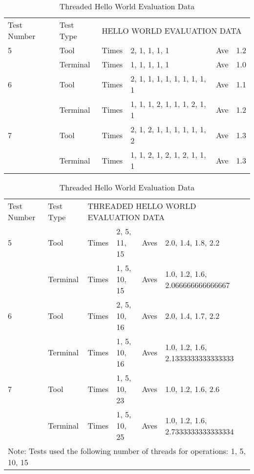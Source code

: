 \begin{table}[h!]
\begin{tabular}{llllll}
Test Number & Test Type & \multicolumn{4}{l}{HELLO WORLD EVALUATION DATA}  \\
5           & Tool      & Times & 2, 1, 1, 1, 1                & Ave & 1.2 \\
            & Terminal  & Times & 1, 1, 1, 1, 1                & Ave & 1.0 \\
6           & Tool      & Times & 2, 1, 1, 1, 1, 1, 1, 1, 1, 1 & Ave & 1.1 \\
            & Terminal  & Times & 1, 1, 1, 2, 1, 1, 1, 2, 1, 1 & Ave & 1.2 \\
7           & Tool      & Times & 2, 1, 2, 1, 1, 1, 1, 1, 1, 2 & Ave & 1.3 \\
            & Terminal  & Times & 1, 1, 2, 1, 2, 1, 2, 1, 1, 1 & Ave & 1.3
\end{tabular}
\caption{Hello World Evaluation Data}
\label{tab:helloWorld}


\begin{tabular}{llllll}
Test Number  & Test Type  & \multicolumn{4}{l}{THREADED HELLO WORLD EVALUATION DATA}            \\
5            & Tool       & Times  & 2, 5, 11, 15  & Aves  & 2.0, 1.4, 1.8, 2.2                 \\
             & Terminal   & Times  & 1, 5, 10, 15  & Aves  & 1.0, 1.2, 1.6, 2.066666666666667   \\
6            & Tool       & Times  & 2, 5, 10, 16  & Aves  & 2.0, 1.4, 1.7, 2.2                 \\
             & Terminal   & Times  & 1, 5, 10, 16  & Aves  & 1.0, 1.2, 1.6, 2.1333333333333333  \\
7            & Tool       & Times  & 1, 5, 10, 23  & Aves  & 1.0, 1.2, 1.6, 2.6                 \\
             & Terminal   & Times  & 1, 5, 10, 25  & Aves  & 1.0, 1.2, 1.6, 2.7333333333333334  \\
\multicolumn{6}{l}{Note: Tests used the following number of threads for operations: 1, 5, 10, 15}
\end{tabular}
\caption{Threaded Hello World Evaluation Data}
\label{tab:threadHello}



\end{table}

